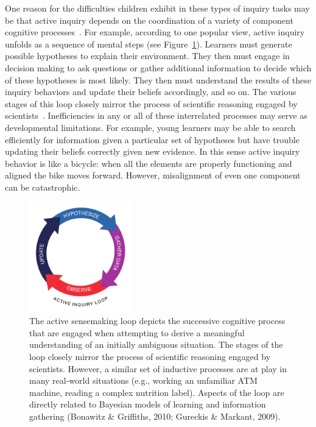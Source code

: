 \documentclass[man,floatsintext]{apa6}
\begin{document}
One reason for the difficulties children exhibit in these types of inquiry tasks may be that 
active inquiry depends on the coordination of a variety of 
component cognitive processes~\cite{Bonawitz:2010pb,Coenen:2015nr}.
For example, according to one popular view, active inquiry unfolds as a sequence
of mental steps (see Figure~\ref{fig:sensemaking_loop}).  Learners must generate 
possible hypotheses to explain their environment.  They then must engage in 
decision making to ask questions or gather additional information to decide which of
these hypotheses is most likely.
They then must understand the results of these inquiry behaviors and update their 
beliefs accordingly, and so on.  The various 
stages of this loop closely mirror the process of scientific reasoning engaged by 
scientists~\cite{Russell:1993,Klein:2006a,Klein:2006b}. 
Inefficiencies in any or all of these interrelated processes may serve as developmental limitations.  
For example, young learners may be able to search efficiently for information given a particular 
set of hypotheses but have trouble updating their beliefs correctly given new evidence.
In this sense active inquiry behavior is like a bicycle: when all the elements are properly functioning
and aligned the bike moves forward.  
However, misalignment of even one component can be catastrophic.

\begin{figure}[!h]
  \centering
  \includegraphics[width=0.40\textwidth]{figures/sensemakingloop}
  \caption{The active sensemaking loop depicts the successive cognitive process that are 
engaged when attempting to derive a meaningful understanding of an initially 
ambiguous situation. The stages of the loop closely mirror the process of scientific 
reasoning engaged by scientists. However, a similar set of inductive processes are 
at play in many real-world situations (e.g., working an unfamiliar ATM machine, 
reading a complex nutrition label).  Aspects of the loop are directly related to 
Bayesian models of learning and information gathering (Bonawitz \& Griffiths, 2010; Gureckis \& Markant, 2009).}
  \label{fig:sensemaking_loop}
\end{figure} 
\nocite{Bonawitz:2010pb,Gureckis:2009}
\end{document}
